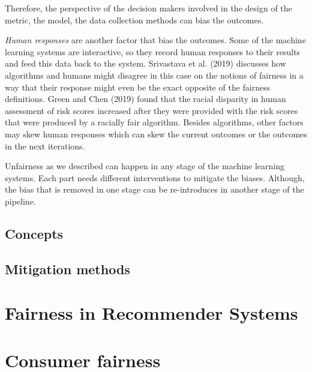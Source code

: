     Therefore, the perspective of the decision makers involved in the design of the metric, the model, the data collection methods can bias the outcomes.
    
    \textit{Human responses} are another factor that bias the outcomes. Some of the machine learning systems are interactive, so they record human responses to their results and feed this data back to the system. Srivastava et al. (2019) \cite{Srivastava2019fairnessnotions} discusses how algorithms and humans might disagree in this case on the notions of fairness in a way that their response might even be the exact opposite of the fairness definitions. Green and Chen (2019) \cite{Green2019algointheloop} found that the racial disparity in human assessment of risk scores increased after they were provided with the risk scores that were produced by a racially fair algorithm. Besides algorithms, other factors may skew human responses which can skew the current outcomes or the outcomes in the next iterations.
    
    Unfairness as we described can happen in any stage of the machine learning systems. Each part needs different interventions to mitigate the biases. Although, the bias that is removed in one stage can be re-introduces in another stage of the pipeline.
    
    
    \subsection{Concepts}
    
    
    \subsection{Mitigation methods}


\section{Fairness in Recommender Systems}
\label{sec:fairness_recsys}


\section{Consumer fairness}
\label{fairness_cf}

